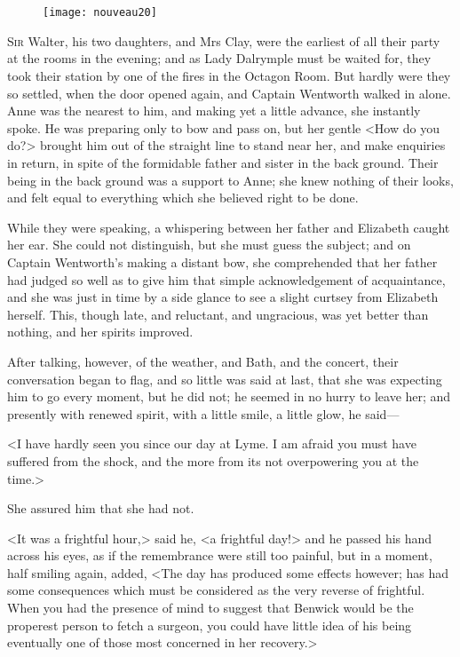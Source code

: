 \chapter[Chapter \thechapter]{}
	
\begin{figure}[t!]
\centering
\texttt{[image: nouveau20]}
\end{figure}

\lettrine[lraise=0.3]{S}{ir} Walter, his two daughters, and Mrs Clay, were the earliest of all their party at the rooms in the evening; and as Lady Dalrymple must be waited for, they took their station by one of the fires in the Octagon Room. But hardly were they so settled, when the door opened again, and Captain Wentworth walked in alone. Anne was the nearest to him, and making yet a little advance, she instantly spoke. He was preparing only to bow and pass on, but her gentle <How do you do?> brought him out of the straight line to stand near her, and make enquiries in return, in spite of the formidable father and sister in the back ground. Their being in the back ground was a support to Anne; she knew nothing of their looks, and felt equal to everything which she believed right to be done.

While they were speaking, a whispering between her father and Elizabeth caught her ear. She could not distinguish, but she must guess the subject; and on Captain Wentworth's making a distant bow, she comprehended that her father had judged so well as to give him that simple acknowledgement of acquaintance, and she was just in time by a side glance to see a slight curtsey from Elizabeth herself. This, though late, and reluctant, and ungracious, was yet better than nothing, and her spirits improved.

After talking, however, of the weather, and Bath, and the concert, their conversation began to flag, and so little was said at last, that she was expecting him to go every moment, but he did not; he seemed in no hurry to leave her; and presently with renewed spirit, with a little smile, a little glow, he said—

<I have hardly seen you since our day at Lyme. I am afraid you must have suffered from the shock, and the more from its not overpowering you at the time.>

She assured him that she had not.

<It was a frightful hour,> said he, <a frightful day!> and he passed his hand across his eyes, as if the remembrance were still too painful, but in a moment, half smiling again, added, <The day has produced some effects however; has had some consequences which must be considered as the very reverse of frightful. When you had the presence of mind to suggest that Benwick would be the properest person to fetch a surgeon, you could have little idea of his being eventually one of those most concerned in her recovery.>

